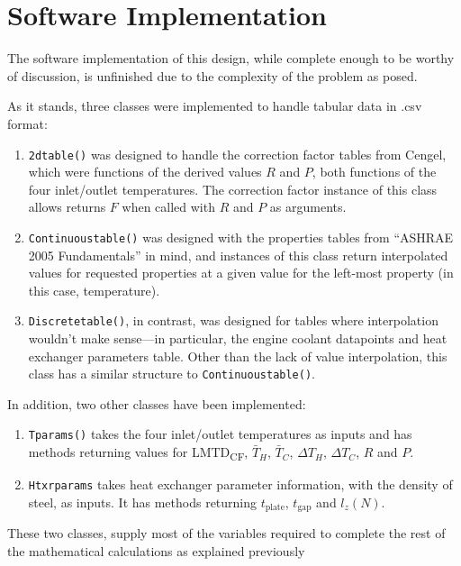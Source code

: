\documentclass[12pt,letterpaper]{article}
\begin{document}
\section{Software Implementation}

The software implementation of this design, while complete enough to be worthy of discussion, is unfinished due to the complexity of the problem as posed.

As it stands, three classes were implemented to handle tabular data in .csv format:

\begin{enumerate}
\item \texttt{2dtable()} was designed to handle the correction factor tables from Cengel, which were functions of the derived values \(R\) and \(P\), both functions of the four inlet/outlet temperatures. The correction factor instance of this class allows returns \(F\) when called with \(R\) and \(P\) as arguments.
\item \texttt{Continuoustable()} was designed with the properties tables from ``ASHRAE 2005 Fundamentals'' in mind, and instances of this class return interpolated values for requested properties at a given value for the left-most property (in this case, temperature).
\item \texttt{Discretetable()}, in contrast, was designed for tables where interpolation wouldn't make sense---in particular, the engine coolant datapoints and heat exchanger parameters table. Other than the lack of value interpolation, this class has a similar structure to \texttt{Continuoustable()}.
\end{enumerate}

In addition, two other classes have been implemented:

\begin{enumerate}
\item \texttt{Tparams()} takes the four inlet/outlet temperatures as inputs and has methods returning values for LMTD\textsubscript{CF}, \(\bar{T}_H\), \(\bar{T}_C\), \(\Delta T_H\), \(\Delta T_C\), \(R\) and \(P\).
\item \texttt{Htxrparams} takes heat exchanger parameter information, with the density of steel, as inputs. It has methods returning \(t_{\textrm{plate}}\), \(t_{\textrm{gap}}\) and \(l_z(N)\).
\end{enumerate}

These two classes, supply most of the variables required to complete the rest of the mathematical calculations as explained previously
\end{document}
